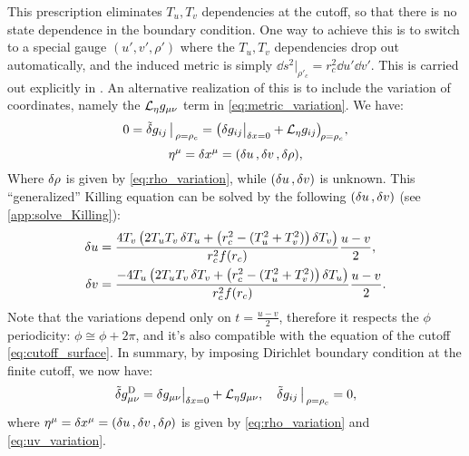 \documentclass[12pt,a4paper,utf8]{article}
\newcommand{\tvar}[1]{\mathinner{\tilde{\delta} #1}}
\begin{document}
	This prescription eliminates $T_u,T_v$ dependencies at the cutoff, so that there is no state dependence in the boundary condition. One way to achieve this is to switch to a special gauge $(u',v',\rho')$ where the $T_u,T_v$ dependencies drop out automatically, and the induced metric is simply $
		\dd{s^2}|_{\rho'_c}
		= r_c^2 \dd{u'} \dd{v'}
	$. This is carried out explicitly in \cite{Guica:2019nzm,Kraus:2021cwf}. 
	An alternative realization of this is to include the variation of coordinates, namely the $\mathcal{L}_{\mathnormal{\eta}} g_{\mu\nu}$ term in \eqref{eq:metric_variation}. We have:
	\begin{equation}
		0 = \tvar{g_{ij}}\big|_{\,\rho = \rho_c}
		= \pqty{
				\delta g_{ij}\big
					|_{\var{x} = 0}
				+ \ldv{\eta} g_{ij}
			}_{\!\rho = \rho_c\!},
	\label{eq:generalized_Killing}
	\end{equation}
	\begin{equation}
		\eta^\mu = \mathinner{\delta x^\mu}
		= (\mathinner{\delta u},\mathinner{\delta v},\mathinner{\delta \rho}),
	\end{equation}
	Where $\mathinner{\delta \rho}$ is given by \eqref{eq:rho_variation}, while $(\mathinner{\delta u},\mathinner{\delta v})$ is unknown. 
	This ``generalized'' Killing equation can be solved by the following $(\mathinner{\delta u},\mathinner{\delta v})$ (see \autoref{app:solve_Killing}):
	\begin{equation}
	\begin{aligned}
		\mathinner{\delta u}
		&= \frac{
			4T_v \left(
				2T_u T_v \mathinner{\delta T_u}
				+ \left(r_c^2 - (T_u^2 + T_v^2)\right) \mathinner{\delta T_v}
			\right)
		}{r_c^2 f(r_c)}
		\frac{u - v}{2},
	\\
		\mathinner{\delta v}
		&= \frac{
			-4T_u \left(
				2T_u T_v \mathinner{\delta T_v}
				+ \left(r_c^2 - (T_u^2 + T_v^2)\right) \mathinner{\delta T_u}
			\right)
		}{r_c^2 f(r_c)}
		\frac{u - v}{2}.
	\end{aligned}
	\label{eq:uv_variation}
	\end{equation}
	Note that the variations depend only on $t = \frac{u - v}{2}$, therefore it respects the $\phi$ periodicity: $\phi \cong \phi + 2\pi$, and it's also compatible with the equation of the cutoff \eqref{eq:cutoff_surface}. 
	In summary, by imposing Dirichlet boundary condition at the finite cutoff, we now have:
	\begin{equation}
		\tvar{g^\mrm{D}_{\mu\nu}}
		= \delta g_{\mu\nu}\big|_{\var{x} = 0}
			+ \ldv{\eta} g_{\mu\nu},
	\quad
		\tvar{g_{ij}}\big|_{\,\rho = \rho_c}
		= 0,
	\end{equation}
	where $
		\eta^\mu = \mathinner{\delta x^\mu}
		= (\mathinner{\delta u},\mathinner{\delta v},\mathinner{\delta \rho})
	$ is given by \eqref{eq:rho_variation} and \eqref{eq:uv_variation}. 
	
\end{document}
